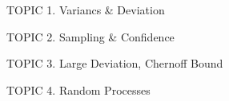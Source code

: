 \documentclass[handout]{mcs}
\begin{document}
\renewcommand{\reading}{
}

\begin{staffnotes}
TOPIC 1.  Variancs \& Deviation

TOPIC 2.  Sampling \& Confidence

TOPIC 3.  Large Deviation, Chernoff Bound

TOPIC 4.  Random Processes

\end{staffnotes}

\end{document}

